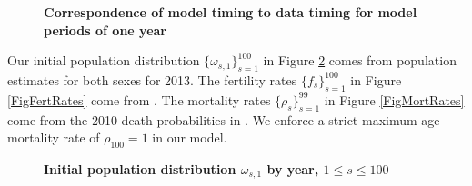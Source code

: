 \documentclass[letterpaper,12pt]{article}
\theoremstyle{definition}
\begin{document}
  \begin{figure}[htbp]\centering \captionsetup{width=4.0in}
    \caption{\label{FigPerTime}\textbf{Correspondence of model timing to data timing for model periods of one year}}
  \end{figure}

  Our initial population distribution $\{\omega_{s,1}\}_{s=1}^{100}$ in Figure \ref{FigInitPopDist} comes from \citet{Census:2014} population estimates for both sexes for 2013. The fertility rates $\{f_s\}_{s=1}^{100}$ in Figure \ref{FigFertRates} come from \citet[Table 1]{NVSR:2010}. The mortality rates $\{\rho_s\}_{s=1}^{99}$ in Figure \ref{FigMortRates} come from the 2010 death probabilities in \citet{SocSec:2010}. We enforce a strict maximum age mortality rate of $\rho_{100}=1$ in our model.

  \begin{figure}[htbp]\centering \captionsetup{width=4.0in}
    \caption{\label{FigInitPopDist}\textbf{Initial population distribution $\omega_{s,1}$ by year, $1\leq s\leq 100$}}
  \end{figure}
\end{document}

